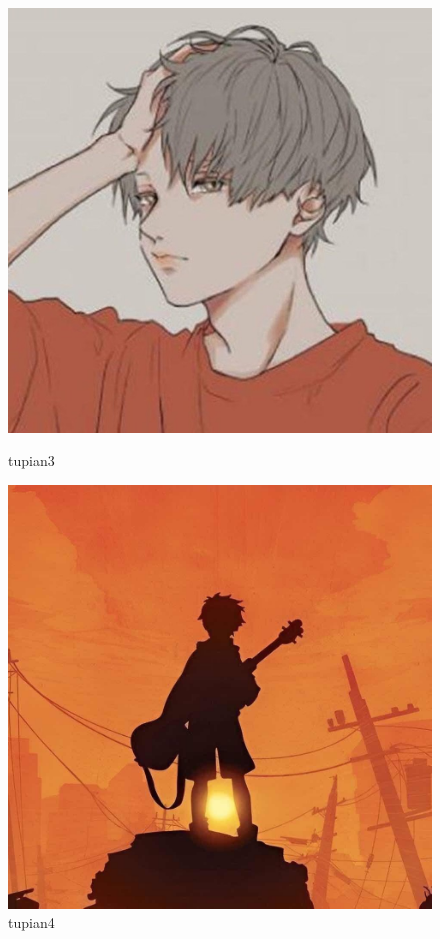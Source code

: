 \documentclass[a4paper]{article}  %
\begin{document}
\begin{figure}[htbp]
	\begin{minipage}{0.49\linewidth}
		\centering
		\includegraphics[width=0.9\linewidth]{contents/rsa4.jpg}
		\caption{tupian3}
		\label{tupian3}%
	\end{minipage}
	\begin{minipage}{0.49\linewidth}
		\centering
		\includegraphics[width=0.9\linewidth]{contents/rsa5.jpg}
		\caption{tupian4}
		\label{tupian4}%
	\end{minipage}
\end{figure}
\end{document}
